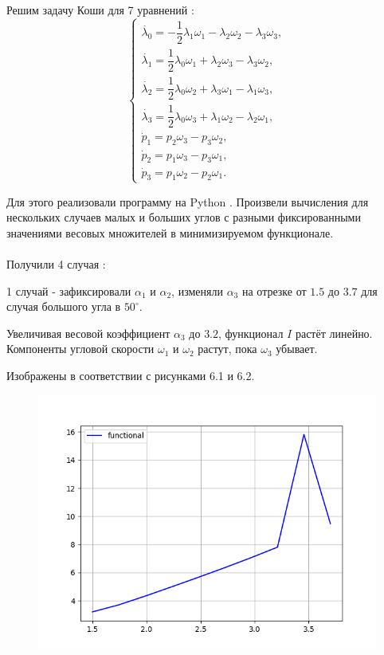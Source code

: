 \documentclass[14pt]{extreport}
\begin{document}
Решим задачу Коши для 7 уравнений \cite{moiseev}:
\begin{equation}
\begin{cases}
\dot{\lambda_{0}} = -\dfrac{1}{2} \lambda_{1}\omega_{1} - \lambda_{2}\omega_{2} - \lambda_{3}\omega_{3},\\
\dot{\lambda_{1}} = \dfrac{1}{2} \lambda_{0}\omega_{1} + \lambda_{2}\omega_{3} - \lambda_{3}\omega_{2},\\
\dot{\lambda_{2}} = \dfrac{1}{2} \lambda_{0}\omega_{2} + \lambda_{3}\omega_{1} - \lambda_{1}\omega_{3},\\
\dot{\lambda_{3}} = \dfrac{1}{2} \lambda_{0}\omega_{3} + \lambda_{1}\omega_{2} - \lambda_{2}\omega_{1},\\
\dot{p}_1 = p_2 \omega_3 - p_3 \omega_2,\\
\dot{p}_2 = p_1 \omega_3 - p_3 \omega_1,\\
\dot{p}_3 = p_1 \omega_2 - p_2 \omega_1.
\end{cases}
\end{equation}

Для этого реализовали программу на Python \cite{python}. Произвели вычисления для нескольких случаев малых и больших углов с разными фиксированными значениями весовых множителей в минимизируемом функционале.\\\\

Получили 4 случая \cite{scipy}:

1 случай - зафиксировали $\alpha_1$ и $\alpha_2$, изменяли $\alpha_3$ на отрезке от $1.5$ до $3.7$ для случая большого угла в $50^{\circ}$.

Увеличивая весовой коэффициент $\alpha_3$ до $3.2$, функционал $I$ растёт линейно. Компоненты угловой скорости $\omega_1$ и $\omega_2$ растут, пока $\omega_3$ убывает.

Изображены в соответствии с рисунками 6.1 и 6.2.

\begin{figure}[H]
\center\includegraphics[scale=0.8]{fig/functional_1_5-3_7_50.png}
\caption{}
\end{figure}
\end{document}
